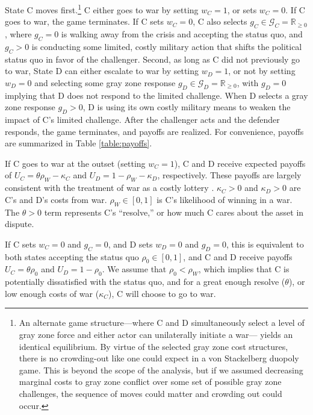 \documentclass[11pt,letterpaper,pdftex,dvipsnames,table]{article}
\begin{document}
State C moves first.\footnote{An alternate game structure---where C and D simultaneously select a level of gray zone force and either actor can unilaterally initiate a war--- yields an identical equilibrium. By virtue of the selected gray zone cost structures, there is no crowding-out like one could expect in a von Stackelberg duopoly game. This is beyond the scope of the analysis, but if we assumed decreasing marginal costs to gray zone conflict over some set of possible gray zone challenges, the sequence of moves could matter and crowding out could occur.} C either goes to war by setting $w_{C}=1$, or sets $w_{C}=0$. If C goes to war, the game terminates. If C sets $w_{C}=0$, C also selects $g_{C}\in\mathcal{G}_{C}=\mathbb{R}_{\geq0}$, where $g_{C}=0$ is walking away from the crisis and accepting the status quo, and $g_{C}>0$ is conducting some limited, costly military action that shifts the political status quo in favor of the challenger. Second, as long as C did not previously go to war, State D can either escalate to war by setting $w_{D}=1$, or not by setting $w_{D}=0$ and selecting some gray zone response $g_{D}\in\mathcal{G}_{D}=\mathbb{R}_{\geq0}$, with $g_{D}=0$ implying that D does not respond to the limited challenge. When D selects a gray zone response $g_{D}>0$, D is using its own costly military means to weaken the impact of C's limited challenge. After the challenger acts and the defender responds, the game terminates, and payoffs are realized. For convenience, payoffs are summarized in Table \ref{table:payoffs}.
    
If C goes to war at the outset (setting $w_{C}=1$), C and D receive expected payoffs of $U_{C}=\theta\rho_{W}-\kappa_{C}$ and $U_{D}=1-\rho_{W}-\kappa_{D}$, respectively. These payoffs are largely consistent with the treatment of war as a costly lottery \citep{fearon_rationalistexplanationswar_1995, fearon_signalingforeignpolicy_1997}. $\kappa_{C}>0$ and $\kappa_{D}>0$ are C's and D's costs from war. $\rho_{W}\in[0,1]$ is C's likelihood of winning in a war. The $\theta>0$ term represents C's ``resolve,'' or how much C cares about the asset in dispute.
    
If C sets $w_{C}=0$ and $g_{C}=0$, and D sets $w_{D}=0$ and $g_{D}=0$, this is equivalent to both states accepting the status quo $\rho_{0}\in[0,1]$, and C and D receive payoffs $U_{C}=\theta\rho_{0}$ and $U_{D}=1-\rho_{0}$. We assume that $\rho_{0}<\rho_{W}$, which implies that C is potentially dissatisfied with the status quo, and for a great enough resolve ($\theta$), or low enough costs of war ($\kappa_{C}$), C will choose to go to war.  
\end{document}
